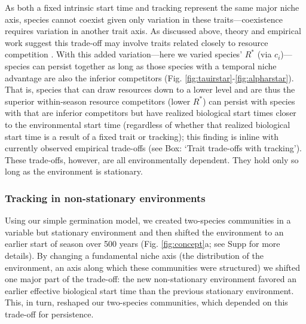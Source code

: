 \documentclass[11pt,letterpaper]{article}
\begin{document}
As both a fixed intrinsic start time and tracking represent the same major niche axis, species cannot coexist given only variation in these traits---coexistence requires variation in another trait axis. As discussed above, theory and empirical work suggest this trade-off may involve traits related closely to resource competition \citep{Chesson:2004eo}. With this added variation---here we varied species' $R^*$ (via $c_i$)---species can persist together as long as those species with a temporal niche advantage are also the inferior competitors (Fig. \ref{fig:tauirstar}-\ref{fig:alpharstar}). That is, species that can draw resources down to a lower level and are thus the superior within-season resource competitors (lower $R^*$) can persist with species with that are inferior competitors but have realized biological start times closer to the environmental start time (regardless of whether that realized biological start time is a result of a fixed trait or tracking); this finding is inline with currently observed empirical trade-offs (see Box: `Trait trade-offs with tracking'). These trade-offs, however, are all environmentally dependent. They hold only so long as the environment is stationary. 

\subsubsection{Tracking in non-stationary environments}

Using our simple germination model, we created two-species communities in a variable but stationary environment and then shifted the environment to an earlier start of season over 500 years (Fig. \ref {fig:concept}a; see Supp for more details). By changing a fundamental niche axis (the distribution of the environment, an axis along which these communities were structured) we shifted one major part of the trade-off: the new non-stationary environment favored an earlier effective biological start time than the previous stationary environment. This, in turn, reshaped our two-species communities, which depended on this trade-off for persistence. %
\end{document}
